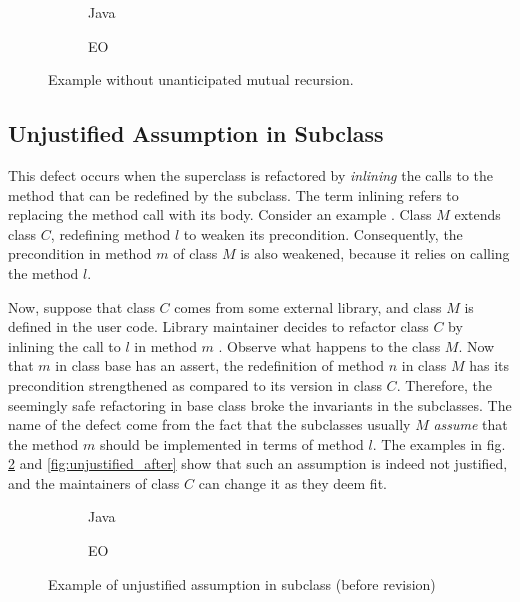 \begin{figure}
    \centering
    \begin{subfigure}{0.4\textwidth}
        
        \caption{Java}
    \end{subfigure}
    \hfill
    \begin{subfigure}{0.4\textwidth}
        
        \caption{EO}
    \end{subfigure}
    \caption{Example without unanticipated mutual recursion.}
    \label{fig:oddeven}
\end{figure}

\subsection{Unjustified Assumption in Subclass}
This defect \cite[Section 3.3]{fragilebaseclass} occurs when the superclass is refactored by \textit{inlining} the calls to the method that can be redefined by the subclass. The term inlining refers to replacing the method call with its body. Consider an example . Class $M$ extends class $C$, redefining method $l$ to weaken its precondition. Consequently, the precondition in method $m$ of class $M$ is also weakened, because it relies on calling the method $l$.

Now, suppose that class $C$ comes from some external library, and class $M$ is defined in the user code. Library maintainer decides to refactor class $C$ by inlining the call to $l$ in method $m$ . Observe what happens to the class $M$. Now that $m$ in class base has an assert, the redefinition of method $n$ in class $M$ has its precondition strengthened as compared to its version in class $C$. Therefore, the seemingly safe refactoring in base class broke the invariants in the subclasses. The name of the defect come from the fact that the subclasses usually $M$ \textit{assume} that the method $m$ should be implemented in terms of method $l$. The examples in fig. \ref{fig:unjustified_before} and \ref{fig:unjustified_after} show that such an assumption is indeed not justified, and the maintainers of class $C$ can change it as they deem fit.

\begin{figure}
    \centering
    \begin{subfigure}{0.4\textwidth}
        
        \caption{Java}
    \end{subfigure}
    \hfill
    \begin{subfigure}{0.4\textwidth}
        
        \caption{EO}
    \end{subfigure}
    \caption{Example of unjustified assumption in subclass (before revision)}
    \label{fig:unjustified_before}
\end{figure}

